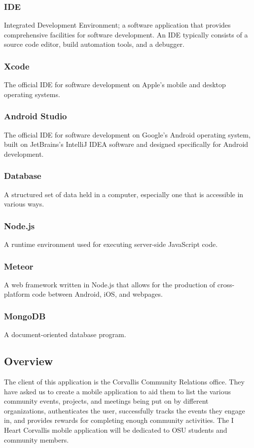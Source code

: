\documentclass[draftclsnofoot, onecolumn, 10pt, compsoc]{IEEEtran}
\begin{document}
			\subsubsection{IDE} Integrated Development Environment; a software application that provides comprehensive facilities for software development. An IDE typically consists of a source code editor, build automation tools, and a debugger.
			\subsubsection{Xcode} The official IDE for software development on Apple's mobile and desktop operating systems.
			\subsubsection{Android Studio} The official IDE for software development on Google's Android operating system, built on JetBrains's IntelliJ IDEA software and designed specifically for Android development.
			\subsubsection{Database} A structured set of data held in a computer, especially one that is accessible in various ways.
			\subsubsection{Node.js} A runtime environment used for executing server-side JavaScript code.
			\subsubsection{Meteor} A web framework written in Node.js that allows for the production of cross-platform code between Android, iOS, and webpages.
			\subsubsection{MongoDB} A document-oriented database program.
					
		\subsection{Overview}
			The client of this application is the Corvallis Community Relations office. They have asked us to create a mobile application to aid them to list the various community events, projects, and meetings being put on by different organizations, authenticates the user, successfully tracks the events they engage in, and provides rewards for completing enough community activities. The I Heart Corvallis mobile application will be dedicated to OSU students and community members.  
	
\end{document}
